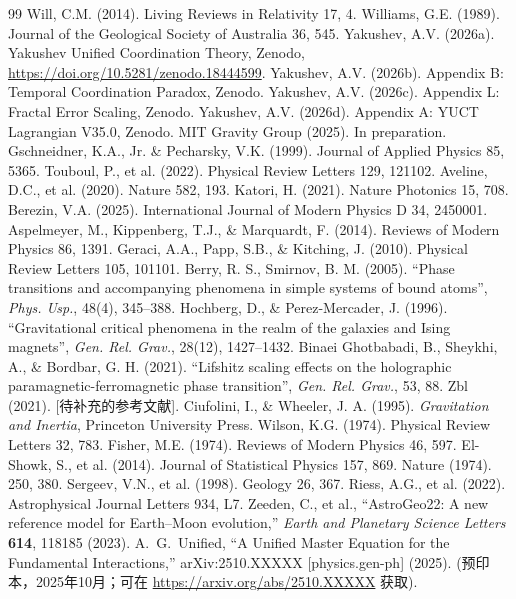 \documentclass[12pt]{article}
\theoremstyle{remark}
\begin{document}
\begin{thebibliography}{99}
		 Will, C.M. (2014). Living Reviews in Relativity 17, 4.
		 Williams, G.E. (1989). Journal of the Geological Society of Australia 36, 545.
		 Yakushev, A.V. (2026a). Yakushev Unified Coordination Theory, Zenodo, \url{https://doi.org/10.5281/zenodo.18444599}.
		 Yakushev, A.V. (2026b). Appendix B: Temporal Coordination Paradox, Zenodo.
		 Yakushev, A.V. (2026c). Appendix L: Fractal Error Scaling, Zenodo.
		 Yakushev, A.V. (2026d). Appendix A: YUCT Lagrangian V35.0, Zenodo.
		 MIT Gravity Group (2025). In preparation.
		 Gschneidner, K.A., Jr. \& Pecharsky, V.K. (1999). Journal of Applied Physics 85, 5365.
		 Touboul, P., et al. (2022). Physical Review Letters 129, 121102.
		 Aveline, D.C., et al. (2020). Nature 582, 193.
		 Katori, H. (2021). Nature Photonics 15, 708.
		 Berezin, V.A. (2025). International Journal of Modern Physics D 34, 2450001.
		 Aspelmeyer, M., Kippenberg, T.J., \& Marquardt, F. (2014). Reviews of Modern Physics 86, 1391.
		 Geraci, A.A., Papp, S.B., \& Kitching, J. (2010). Physical Review Letters 105, 101101.
		 Berry, R. S., Smirnov, B. M. (2005). ``Phase transitions and accompanying phenomena in simple systems of bound atoms'', \textit{Phys. Usp.}, 48(4), 345–388.
		 Hochberg, D., \& Perez-Mercader, J. (1996). ``Gravitational critical phenomena in the realm of the galaxies and Ising magnets'', \textit{Gen. Rel. Grav.}, 28(12), 1427–1432.
		 Binaei Ghotbabadi, B., Sheykhi, A., \& Bordbar, G. H. (2021). ``Lifshitz scaling effects on the holographic paramagnetic-ferromagnetic phase transition'', \textit{Gen. Rel. Grav.}, 53, 88.
		 Zbl (2021). [待补充的参考文献].
		 Ciufolini, I., \& Wheeler, J. A. (1995). \textit{Gravitation and Inertia}, Princeton University Press.
		 Wilson, K.G. (1974). Physical Review Letters 32, 783.
		 Fisher, M.E. (1974). Reviews of Modern Physics 46, 597.
		 El-Showk, S., et al. (2014). Journal of Statistical Physics 157, 869.
		 Nature (1974). 250, 380.
		 Sergeev, V.N., et al. (1998). Geology 26, 367.
		 Riess, A.G., et al. (2022). Astrophysical Journal Letters 934, L7.
		 Zeeden, C., et al., ``AstroGeo22: A new reference model for Earth–Moon evolution,'' \emph{Earth and Planetary Science Letters} \textbf{614}, 118185 (2023).
		A.~G.~Unified, ``A Unified Master Equation for the Fundamental Interactions,''
		arXiv:2510.XXXXX [physics.gen-ph] (2025).
		(预印本，2025年10月；可在 \url{https://arxiv.org/abs/2510.XXXXX} 获取).
		

\end{thebibliography}
\end{document}
